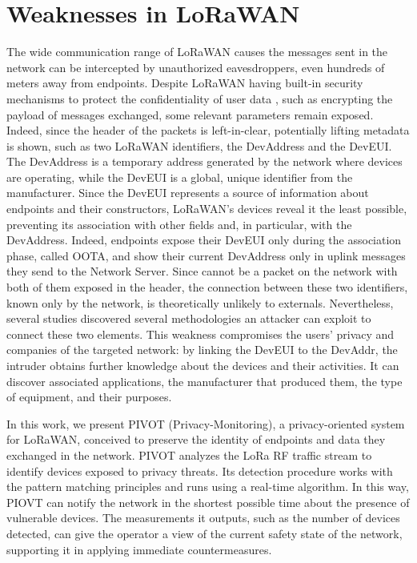 \section{Weaknesses in LoRaWAN}
The wide communication range of LoRaWAN causes the messages sent in the network can be intercepted by unauthorized eavesdroppers, even hundreds of meters away from endpoints. Despite LoRaWAN having built-in security mechanisms to protect the confidentiality of user data \cite{Moraes2021ASR}, such as encrypting the payload of messages exchanged, some relevant parameters remain exposed. Indeed, since the header of the packets is left-in-clear, potentially lifting metadata is shown, such as two LoRaWAN identifiers, the DevAddress and the DevEUI. The DevAddress is a temporary address generated by the network where devices are operating, while the DevEUI is a global, unique identifier from the manufacturer. Since the DevEUI represents a source of information about endpoints and their constructors, LoRaWAN's devices reveal it the least possible, preventing its association with other fields and, in particular, with the DevAddress. Indeed, endpoints expose their DevEUI only during the association phase, called OOTA, and show their current DevAddress only in uplink messages they send to the Network Server. Since cannot be a packet on the network with both of them exposed in the header, the connection between these two identifiers, known only by the network, is theoretically unlikely to externals. Nevertheless, several studies discovered several methodologies an attacker can exploit to connect these two elements. This weakness compromises the users' privacy and companies of the targeted network: by linking the DevEUI to the DevAddr, the intruder obtains further knowledge about the devices and their activities. It can discover associated applications, the manufacturer that produced them, the type of equipment, and their purposes.

\vspace{5mm} %

In this work, we present PIVOT (Privacy-Monitoring), a privacy-oriented system for LoRaWAN, conceived to preserve the identity of endpoints and data they exchanged in the network. PIVOT analyzes the LoRa RF traffic stream to identify devices exposed to privacy threats. Its detection procedure works with the pattern matching principles and runs using a real-time algorithm. In this way, PIOVT can notify the network in the shortest possible time about the presence of vulnerable devices. The measurements it outputs, such as the number of devices detected, can give the operator a view of the current safety state of the network, supporting it in applying immediate countermeasures.

